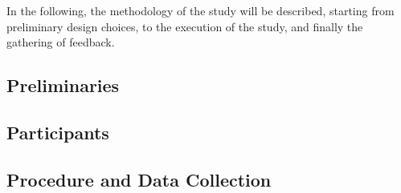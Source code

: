 In the following, the methodology of the study will be 
described, starting from preliminary design choices, 
to the execution of the study, and finally the gathering of feedback.

\subsection{\label{sec::Preliminaries}Preliminaries}

\subsection{\label{sec::Participants}Participants}

\subsection{\label{sec::Execution}Procedure and Data Collection}
